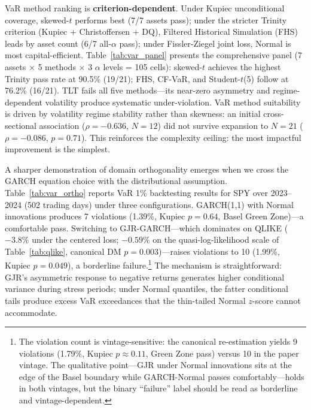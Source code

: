 VaR method ranking is \textbf{criterion-dependent}. Under Kupiec unconditional coverage, skewed-$t$ performs best (7/7 assets pass); under the stricter Trinity criterion (Kupiec + Christoffersen + DQ), Filtered Historical Simulation (FHS) leads by asset count (6/7 all-$\alpha$ pass); under Fissler-Ziegel joint loss, Normal is most capital-efficient. Table~\ref{tab:var_panel} presents the comprehensive panel (7 assets $\times$ 5 methods $\times$ 3 $\alpha$ levels = 105 cells): skewed-$t$ achieves the highest Trinity pass rate at 90.5\% (19/21); FHS, CF-VaR, and Student-$t$(5) follow at 76.2\% (16/21). TLT fails all five methods---its near-zero asymmetry and regime-dependent volatility produce systematic under-violation. VaR method suitability is driven by volatility regime stability rather than skewness: an initial cross-sectional association ($\rho = -0.636$, $N = 12$) did not survive expansion to $N = 21$ ($\rho = -0.086$, $p = 0.71$). This reinforces the complexity ceiling: the most impactful improvement is the simplest.

A sharper demonstration of domain orthogonality emerges when we cross the GARCH equation choice with the distributional assumption. Table~\ref{tab:var_ortho} reports VaR 1\% backtesting results for SPY over 2023--2024 (502 trading days) under three configurations. GARCH(1,1) with Normal innovations produces 7 violations (1.39\%, Kupiec $p = 0.64$, Basel Green Zone)---a comfortable pass. Switching to GJR-GARCH---which dominates on QLIKE ($-3.8\%$ under the \citet{patton2011} centered loss; $-0.59\%$ on the quasi-log-likelihood scale of Table~\ref{tab:qlike}, canonical DM $p = 0.003$)---raises violations to 10 (1.99\%, Kupiec $p = 0.049$), a borderline failure.\footnote{The violation count is vintage-sensitive: the canonical re-estimation yields 9 violations (1.79\%, Kupiec $p \approx 0.11$, Green Zone pass) versus 10 in the paper vintage. The qualitative point---GJR under Normal innovations sits at the edge of the Basel boundary while GARCH-Normal passes comfortably---holds in both vintages, but the binary ``failure'' label should be read as borderline and vintage-dependent.} The mechanism is straightforward: GJR's asymmetric response to negative returns generates higher conditional variance during stress periods; under Normal quantiles, the fatter conditional tails produce excess VaR exceedances that the thin-tailed Normal $z$-score cannot accommodate.

